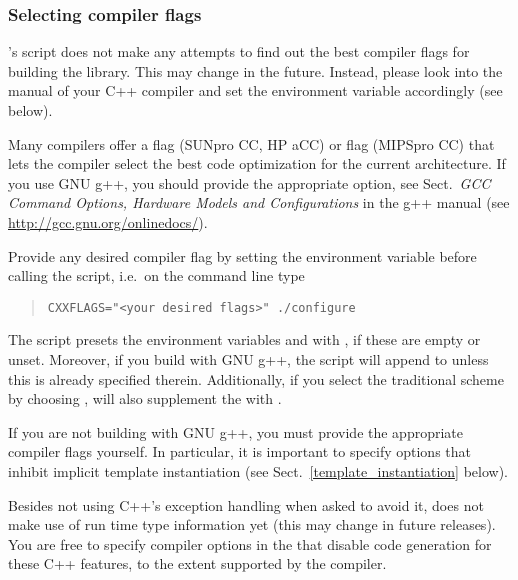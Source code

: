 \subsubsection{Selecting compiler flags}
\LiDIA's  script does not make any attempts to find out the
best compiler flags for building the library.  This may change in the
future.  Instead, please look into the manual of your C++ compiler and set
the  environment variable accordingly (see below).

Many compilers offer a  flag (SUNpro CC, HP aCC) or
 flag (MIPSpro CC) that lets the compiler select the best code
optimization for the current architecture.  If you use GNU g++, you should
provide the appropriate  option, see Sect.~\textit{GCC Command
Options, Hardware Models and Configurations} in the g++ manual (see
\url{http://gcc.gnu.org/onlinedocs/}).

Provide any desired compiler flag by setting the environment variable
 before calling the  script, i.e.\ on the
command line type
\begin{quote}
\begin{verbatim}
CXXFLAGS="<your desired flags>" ./configure
\end{verbatim}
\end{quote}

The  script presets the environment variables 
and  with , if these are empty or unset.  Moreover,
if you build \LiDIA with GNU g++, the  script will append
 to  unless this is already
specified therein.  Additionally, if you select the traditional
 scheme by choosing ,
 will also supplement the  with
.

\attentionI If you are not building with GNU g++, you must provide the
appropriate compiler flags yourself.  In particular, it is important to
specify options that inhibit implicit template instantiation (see
Sect.~\ref{template_instantiation} below).

Besides not using C++'s exception handling when asked to avoid it, \LiDIA
does not make use of run time type information yet (this may change in
future releases).  You are free to specify compiler options in the
 that disable code generation for these C++ features, to the
extent supported by the compiler.

